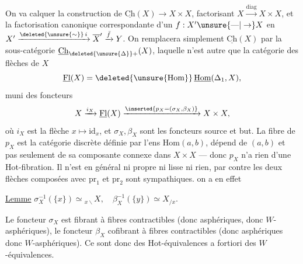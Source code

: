 On va calquer la construction  de $\underline{\mathrm{Ch}}(X)\to X\times X$,  factorisant $X\xrightarrow{\mathrm{diag}}X\times X$, et la  factorisation canonique correspondante d'un $f:X'\unsure{\text{---}|\to}X$ en $X'\xrightarrow{\deleted{\unsure{\sim}}\,i}\overline{X}'\xrightarrow{\bar f}Y$. On remplacera simplement $\underline{\mathrm{Ch}}(X)$ par la sous-catégorie $\underline{\mathrm{Ch}}_{\deleted{\unsure{\Delta}}+}(X)$, laquelle n'est autre que la catégorie des flèches de $X$
\[ \underline{\mathrm{Fl}}(X)=\deleted{\unsure{\mathrm{Hom}}}\,\underline{\mathrm{Hom}}(\Delta_1,X), \]
muni des foncteurs
\[ X\xrightarrow{i_X}\underline{\mathrm{Fl}}(X)\xrightarrow{\inserted{p_X=(\sigma_X,\beta_X)}} X\times X, \]
où $i_X$ est la flèche $x\longmapsto\mathrm{id}_x$, et  $\sigma_X,\beta_X$ sont les foncteurs source et but. La fibre de $p_X$  est la catégorie discrète définie par l'ens $\mathrm{Hom}(a,b)$,  dépend  de $(a,b)$ et pas seulement de sa composante connexe dans $X\times X$ --- donc $p_X$ n'a rien d'une Hot-fibration. Il n'est en général ni propre ni lisse\unsure{,} ni rien, par contre les deux flèches composées avec $\mathrm{pr}_1$ et $\mathrm{pr}_2$
sont sympathiques. on a en effet


\uline{Lemme}  $\sigma_X^{-1}(\{x\})\simeq{}_{x\backslash}X,\quad \beta_X^{-1}(\{y\})\simeq X_{/x}$. 

Le foncteur $\sigma_X$ est fibrant à fibres  contractibles (donc asphériques, donc $W$-asphériques), le foncteur $\beta_X$ cofibrant à fibres contractibles (donc asphériques donc $W$-asphériques). Ce sont donc  des Hot-équivalences a fortiori des $W$-équivalences.

